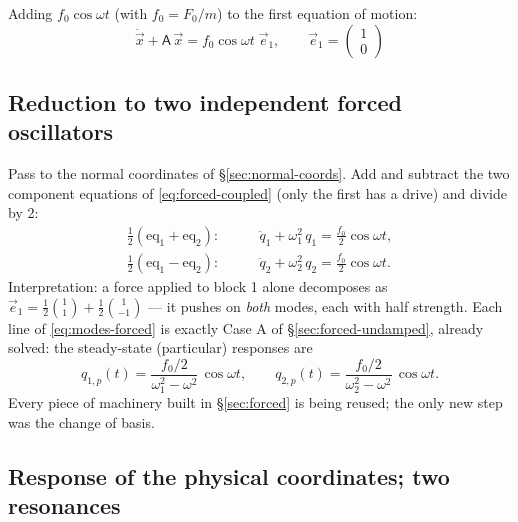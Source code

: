 \documentclass[11pt]{article}
\theoremstyle{plain}
\theoremstyle{definition}
\theoremstyle{remark}
\newcommand{\vx}{\vec{x}}
\newcommand{\ve}{\vec{e}}
\newcommand{\mA}{\mathsf{A}}
\begin{document}
Adding $f_0\cos\omega t$ (with $f_0 = F_0/m$) to the first equation of
motion:
\begin{equation}
  \boxed{\;
  \ddot \vx + \mA\,\vx = f_0\cos\omega t\;\ve_1,
  \qquad
  \ve_1 = \begin{pmatrix}1\\0\end{pmatrix}
  \;}
  \label{eq:forced-coupled}
\end{equation}

\subsection{Reduction to two independent forced oscillators}

Pass to the normal coordinates of \S\ref{sec:normal-coords}. Add and
subtract the two component equations of \eqref{eq:forced-coupled} (only the
first has a drive) and divide by 2:
\begin{align}
  \tfrac12(\text{eq}_1 + \text{eq}_2):&\qquad
  \ddot q_1 + \omega_1^2\, q_1 = \tfrac{f_0}{2}\cos\omega t, \nonumber\\
  \tfrac12(\text{eq}_1 - \text{eq}_2):&\qquad
  \ddot q_2 + \omega_2^2\, q_2 = \tfrac{f_0}{2}\cos\omega t .
  \label{eq:modes-forced}
\end{align}
Interpretation: a force applied to block 1 alone decomposes as
$\ve_1 = \tfrac12\binom11 + \tfrac12\binom{1}{-1}$ --- it pushes on
\emph{both} modes, each with half strength. Each line of
\eqref{eq:modes-forced} is exactly Case A of \S\ref{sec:forced-undamped},
already solved: the steady-state (particular) responses are
\begin{equation}
  q_{1,p}(t) = \frac{f_0/2}{\omega_1^2 - \omega^2}\,\cos\omega t,
  \qquad
  q_{2,p}(t) = \frac{f_0/2}{\omega_2^2 - \omega^2}\,\cos\omega t .
\end{equation}
Every piece of machinery built in \S\ref{sec:forced} is being reused; the
only new step was the change of basis.

\subsection{Response of the physical coordinates; two resonances}
\end{document}
